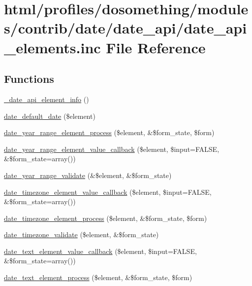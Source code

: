 \hypertarget{date__api__elements_8inc}{
\section{html/profiles/dosomething/modules/contrib/date/date\_\-api/date\_\-api\_\-elements.inc File Reference}
\label{date__api__elements_8inc}
}
\subsection*{Functions}
\begin{DoxyCompactItemize}
\item 
\hyperlink{date__api__elements_8inc_aeffcad67abcab341ed4617c76a59df43}{\_\-date\_\-api\_\-element\_\-info} ()
\item 
\hyperlink{date__api__elements_8inc_af1a4c11c288aec82c194eb7393932ee3}{date\_\-default\_\-date} (\$element)
\item 
\hyperlink{date__api__elements_8inc_a543c5f0338ae1931c7a626a896f6f2c0}{date\_\-year\_\-range\_\-element\_\-process} (\$element, \&\$form\_\-state, \$form)
\item 
\hyperlink{date__api__elements_8inc_a5d5c87e2c1dd81edff2eabdfb11224b7}{date\_\-year\_\-range\_\-element\_\-value\_\-callback} (\$element, \$input=FALSE, \&\$form\_\-state=array())
\item 
\hyperlink{date__api__elements_8inc_a2c68320d30ee6a4f5c33c623f667c305}{date\_\-year\_\-range\_\-validate} (\&\$element, \&\$form\_\-state)
\item 
\hyperlink{date__api__elements_8inc_a551fafa7951b2fb425465e4a668ef078}{date\_\-timezone\_\-element\_\-value\_\-callback} (\$element, \$input=FALSE, \&\$form\_\-state=array())
\item 
\hyperlink{date__api__elements_8inc_ac45026ff7ec5ee2113dbbeec0a079aa5}{date\_\-timezone\_\-element\_\-process} (\$element, \&\$form\_\-state, \$form)
\item 
\hyperlink{date__api__elements_8inc_a407096cd20b66a684641e1617178619c}{date\_\-timezone\_\-validate} (\$element, \&\$form\_\-state)
\item 
\hyperlink{date__api__elements_8inc_ad77d04d89a7179dba8c76133d5484709}{date\_\-text\_\-element\_\-value\_\-callback} (\$element, \$input=FALSE, \&\$form\_\-state=array())
\item 
\hyperlink{date__api__elements_8inc_ac1b734f1dbb476fe75e096be3dac5d6d}{date\_\-text\_\-element\_\-process} (\$element, \&\$form\_\-state, \$form)

\end{DoxyCompactItemize}
